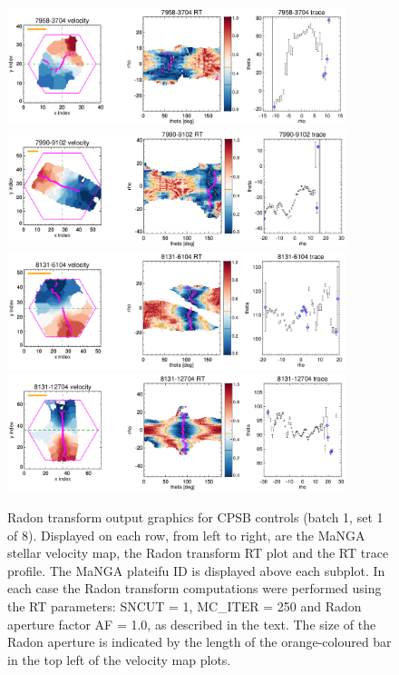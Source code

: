 \documentclass[fleqn,usenatbib]{mnras}
\begin{document}
\begin{figure}
    \centering
    \includegraphics[width=0.88\textwidth]{Images/SN1-MC250/CPSB-CTRL-1-triples/7958-3704-1-250-10.png}
    \includegraphics[width=0.88\textwidth]{Images/SN1-MC250/CPSB-CTRL-1-triples/7990-9102-1-250-10.png}
    \includegraphics[width=0.88\textwidth]{Images/SN1-MC250/CPSB-CTRL-1-triples/8131-6104-1-250-10.png}
    \includegraphics[width=0.88\textwidth]{Images/SN1-MC250/CPSB-CTRL-1-triples/8131-12704-1-250-10.png}    
    \caption{Radon transform output graphics for CPSB controls (batch 1, set 1 of 8). Displayed on each row, from left to right, are the MaNGA stellar velocity map, the Radon transform RT plot and the RT trace profile. The MaNGA plateifu ID is displayed above each subplot. In each case the Radon transform computations were performed using the RT parameters: SNCUT = 1, MC\_ITER = 250 and Radon aperture factor AF = 1.0, as described in the text. The size of the Radon aperture is indicated by the length of the orange-coloured bar in the top left of the velocity map plots.}
    \label{fig:CPSB-CTRL-1-triples-1}
\end{figure}
\end{document}
